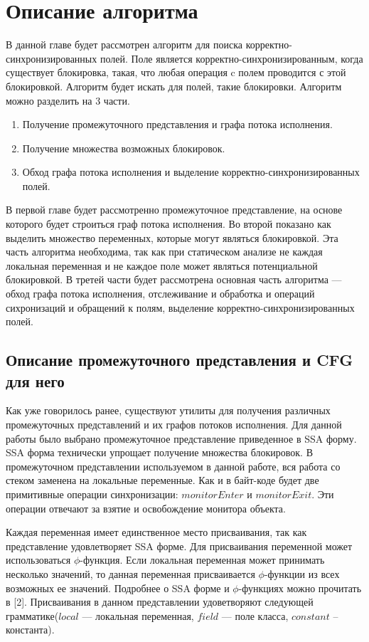 \chapter{Описание алгоритма}


В данной главе будет рассмотрен алгоритм для поиска корректно-синхронизированных полей.
Поле является корректно-синхронизированным, когда существует блокировка, такая, что любая операция c полем проводится с этой блокировкой. Алгоритм будет искать для полей, такие блокировки. 
Алгоритм можно разделить на 3 части. 
\begin{enumerate}
\item Получение промежуточного представления и графа потока исполнения.
\item Получение множества возможных блокировок.
\item Обход графа потока исполнения и выделение корректно-синхронизированных полей.
\end{enumerate}

В первой главе будет рассмотренно промежуточное представление, на основе которого будет строиться граф потока исполнения. Во второй показано как выделить множество переменных, которые могут являться блокировкой. Эта часть алгоритма необходима, так как при статическом анализе не каждая локальная переменная и не каждое поле может являться потенциальной блокировкой. 
В третей части будет рассмотрена основная часть алгоритма --- обход графа потока исполнения, отслеживание и обработка и операций сихронизаций и обращений к полям, выделение корректно-синхронизированных полей.



\FloatBarrier
\section{Описание промежуточного представления и CFG для него}
Как уже говорилось ранее, существуют утилиты для получения различных промежуточных представлений и их графов потоков исполнения. 
Для данной работы было выбрано промежуточное представление приведенное в SSA форму. SSA форма технически упрощает получение множества блокировок. В промежуточном представлении используемом в данной работе, вся работа со стеком заменена на локальные переменные. Как и в байт-коде будет две примитивные операции синхронизации: $monitorEnter$ и $monitorExit$. Эти операции отвечают за взятие и освобождение монитора объекта.

Каждая переменная имеет единственное место присваивания, так как представление удовлетворяет SSA форме. 
Для присваивания переменной может использоваться $\phi$-функция.
Если локальная переменная может принимать несколько значений, то данная переменная присваивается $\phi$-функции из всех возможных ее значений. Подробнее о SSA форме и $\phi$-функциях можно прочитать в [2].
Присваивания в данном представлении удоветворяют следующей грамматике($local$ --- локальная переменная, $field$ --- поле класса, $constant$ -- константа).

